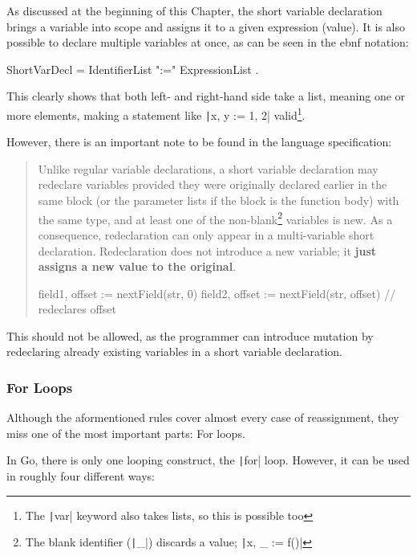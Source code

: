 As discussed at the beginning of this Chapter, the short variable declaration brings
a variable into scope and assigns it to a given expression (value). It is also
possible to declare multiple variables at once, as can be seen in the \gls{ebnf}
notation:
\begin{code}
	\begin{bnfcode}
ShortVarDecl = IdentifierList ":=" ExpressionList .
	\end{bnfcode}
\end{code}
This clearly shows that both left- and right-hand side take a list, meaning one or more
elements, making a statement like \texttt|x, y := 1, 2| valid\footnote{The
\texttt|var| keyword also takes lists, so this is possible too}.

However, there is an important note to be found in the language specification:

\begin{quote}
Unlike regular variable declarations, a short variable declaration may redeclare
variables provided they were originally declared earlier in the same block (or
the parameter lists if the block is the function body) with the same type, and
at least one of the non-blank\footnote{The blank identifier (\texttt|_|)
    discards a value; \texttt|x, _ := f()|} variables is new. As a consequence, redeclaration
can only appear in a multi-variable short declaration. Redeclaration does not
introduce a new variable; it \textbf{just assigns a new value to the original}.
    \begin{gocode}
field1, offset := nextField(str, 0)
field2, offset := nextField(str, offset)  // redeclares offset
    \end{gocode}
\autocite{short-hand-decl}
\end{quote}

This should not be allowed, as the programmer can introduce mutation by redeclaring
already existing variables in a short variable declaration.

\subsubsection{For Loops}

Although the aformentioned rules cover almost every case of reassignment, they miss
one of the most important parts: For loops.

In Go, there is only one looping construct, the \texttt|for| loop. However, it can
be used in roughly four different ways:

